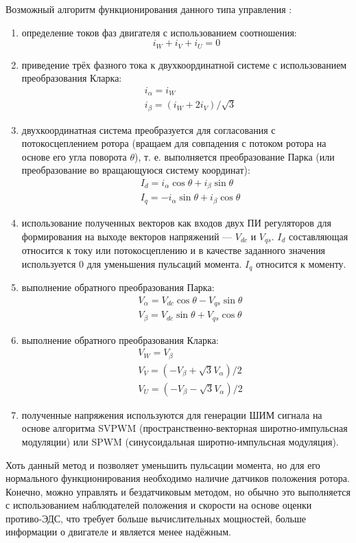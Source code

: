 Возможный алгоритм функционирования данного типа управления \cite{art:foc_control}:
\begin{enumerate}
	\item определение токов фаз двигателя с использованием соотношения:
	\[
		i_W+i_V+i_U=0
	\]
	\item приведение трёх фазного тока к двухкоординатной системе с использованием преобразования Кларка:
	\begin{align*}
		&i_{\alpha}=i_W \\
		&i_{\beta}=(i_W+2i_V)/\sqrt{3}
	\end{align*}
	\item двухкоординатная система преобразуется для согласования с потокосцеплением ротора (вращаем для совпадения с потоком ротора на основе его угла поворота $\theta$), т. е. выполняется преобразование Парка (или преобразование во вращающуюся систему координат):
	\begin{align*}
		&I_d=i_{\alpha}\cos\theta+i_{\beta}\sin\theta\\
		&I_q=-i_{\alpha}\sin\theta+i_{\beta}\cos\theta
	\end{align*}
	\item использование полученных векторов как входов двух ПИ регуляторов для формирования на выходе векторов напряжений --- $V_{dc}$ и $V_{qs}$. $I_d$ составляющая относится к току или потокосцеплению и в качестве заданного значения используется $0$ для уменьшения пульсаций момента. $I_q$ относится к моменту. 
	\item выполнение обратного преобразования Парка:
	\begin{align*}
		&V_{\alpha}=V_{dc}\cos\theta-V_{qs}\sin\theta \\
		&V_{\beta}=V_{dc}\sin\theta+V_{qs}\cos\theta
	\end{align*}
	\item выполнение обратного преобразования Кларка:
	\begin{align*}
		&V_W=V_{\beta}\\
		&V_V=(-V_{\beta}+\sqrt{3}V_{\alpha})/2\\
		&V_U=(-V_{\beta}-\sqrt{3}V_{\alpha})/2
	\end{align*}
	\item полученные напряжения используются для генерации ШИМ сигнала на основе алгоритма SVPWM (пространственно-векторная широтно-импульсная модуляции) или SPWM (синусоидальная широтно-импульсная модуляция).
\end{enumerate}

Хоть данный метод и позволяет уменьшить пульсации момента, но для его нормального функционирования необходимо наличие датчиков положения ротора. Конечно, можно управлять и бездатчиковым методом, но обычно это выполняется с использованием наблюдателей положения и скорости на основе оценки противо-ЭДС, что требует больше вычислительных мощностей, больше информации о двигателе и является менее надёжным.

